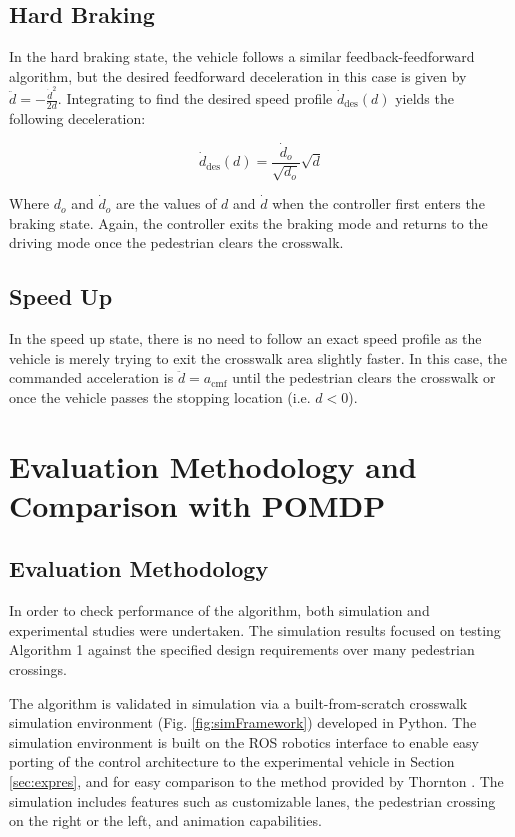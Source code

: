 \documentclass[letterpaper, 10 pt, conference]{ieeeconf}  %
\begin{document}
\subsection{Hard Braking}

In the hard braking state, the vehicle follows a similar feedback-feedforward algorithm, but the desired feedforward deceleration in this case is given by $\ddot{d} = -\frac{\dot{d}^2}{2d}$. Integrating to find the desired speed profile $\dot{d}_\mathrm{des}(d)$ yields the following deceleration: 

\begin{equation}
\dot{d}_\mathrm{des}(d) = \frac{\dot{d}_o}{\sqrt{d_o}}\sqrt{d}
\end{equation}     

Where $d_o$ and $\dot{d}_o$ are the values of $d$ and $\dot{d}$ when the controller first enters the braking state. Again, the controller exits the braking mode and returns to the driving mode once the pedestrian clears the crosswalk. 

\subsection{Speed Up}

In the speed up state, there is no need to follow an exact speed profile as the vehicle is merely trying to exit the crosswalk area slightly faster. In this case, the commanded acceleration is $\ddot{d} = a_\mathrm{cmf}$ until the pedestrian clears the crosswalk or once the vehicle passes the stopping location (i.e. $d< 0$). 

\section{Evaluation Methodology and Comparison with POMDP}

\subsection{Evaluation Methodology}

In order to check performance of the algorithm, both simulation and experimental studies were undertaken. The simulation results focused on testing Algorithm 1 against the specified design requirements over many pedestrian crossings. 

The algorithm is validated in simulation via a built-from-scratch crosswalk simulation environment (Fig. \ref{fig:simFramework}) developed in Python. The simulation environment is built on the ROS robotics interface to enable easy porting of the control architecture to the experimental vehicle in Section \ref{sec:expres}, and for easy comparison to the method provided by Thornton \cite{Thornton2018}. The simulation includes features such as customizable lanes, the pedestrian crossing on the right or the left, and animation capabilities.   
\end{document}
